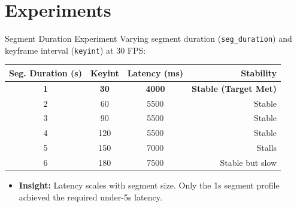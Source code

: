 \documentclass{beamer}
\begin{document}
\section{Experiments}

\begin{frame}{Segment Duration Experiment}
    Varying segment duration (\texttt{seg\_duration}) and keyframe interval (\texttt{keyint}) at 30 FPS:
    \vspace{0.2cm}
    \begin{table}
        \centering
        \scriptsize
        \begin{tabular}{cccr}
            \toprule
            \textbf{Seg. Duration (s)} & \textbf{Keyint} & \textbf{Latency (ms)} & \textbf{Stability} \\
            \midrule
            \textbf{1} & \textbf{30} & \textbf{4000} & \textbf{Stable (Target Met)} \\
            2 & 60 & 5500 & Stable \\
            3 & 90 & 5500 & Stable \\
            4 & 120 & 5500 & Stable \\
            5 & 150 & 7000 & Stalls \\
            6 & 180 & 7500 & Stable but slow \\
            \bottomrule
        \end{tabular}
    \end{table}
    \begin{itemize}
        \item \textbf{Insight:} Latency scales with segment size. Only the 1s segment profile achieved the required under-5s latency.
    \end{itemize}
\end{frame}
\end{document}
